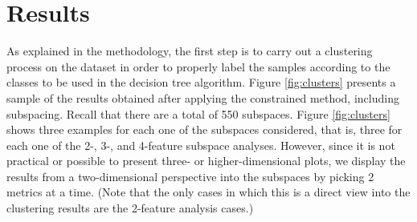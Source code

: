 
\section{Results}
\label{sec:results}

As explained in the methodology, the first step is to carry out a clustering process on the dataset in order to properly label the samples according to the classes to be used in the decision tree algorithm. Figure \ref{fig:clusters} presents a sample of the results obtained after applying the constrained \kmeans{} method, including subspacing. Recall that there are a total of 550 subspaces. Figure \ref{fig:clusters} shows three examples for each one of the subspaces considered, that is, three for each one of the 2-, 3-, and 4-feature subspace analyses. However, since it is not practical or possible to present three- or higher-dimensional plots, we display the results from a two-dimensional perspective into the subspaces by picking 2 metrics at a time. (Note that the only cases in which this is a direct view into the clustering results are the 2-feature analysis cases.)

